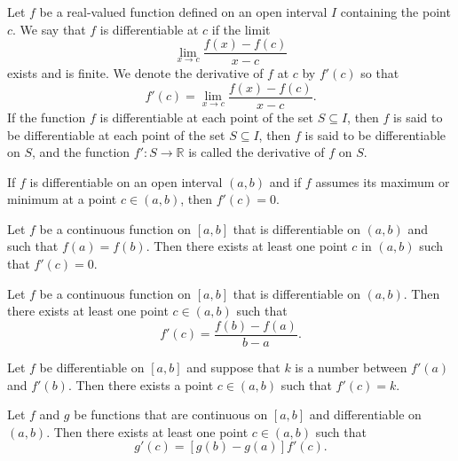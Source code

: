 \documentclass[nobib,notoc]{tufte-handout}
\begin{document}
\begin{defi}[differentiability]
	Let \(f\) be a real-valued function defined on an open interval \(I\) containing the point \(c\). We say that \(f\) is differentiable at \(c\) if the limit
	\begin{equation*}
		\lim_{x\rightarrow c}\frac{f(x)-f(c)}{x-c}
	\end{equation*}
	exists and is finite. We denote the derivative of \(f\) at \(c\) by \(f'(c)\) so that
	\begin{equation*}
		f'(c)=\lim_{x\rightarrow c}\frac{f(x)-f(c)}{x-c}.
	\end{equation*}
	If the function \(f\) is differentiable at each point of the set \(S\subseteq I\), then \(f\) is said to be differentiable at each point of the set \(S\subseteq I\), then \(f\) is said to be differentiable on \(S\), and the function \(f':S\rightarrow\mathbb{R}\) is called the derivative of \(f\) on \(S\).
\end{defi}
\begin{thm}
	If \(f\) is differentiable on an open interval \((a,b)\) and if \(f\) assumes its maximum or minimum at a point \(c\in(a,b)\), then \(f'(c)=0\).
\end{thm}
\begin{thm}
	Let \(f\) be a continuous function on \([a,b]\) that is differentiable on \((a,b)\) and such that \(f(a)=f(b)\). Then there exists at least one point \(c\) in \((a,b)\) such that \(f'(c)=0\).
\end{thm}
\begin{thm}[MVT]
	Let \(f\) be a continuous function on \([a,b]\) that is differentiable on \((a,b)\). Then there exists at least one point \(c\in(a,b)\) such that
	\begin{equation*}
		f'(c)=\frac{f(b)-f(a)}{b-a}.
	\end{equation*}
\end{thm}
\begin{thm}
	Let \(f\) be differentiable on \([a,b]\) and suppose that \(k\) is a number between \(f'(a)\) and \(f'(b)\). Then there exists a point \(c\in(a,b)\) such that \(f'(c)=k\).
\end{thm}
\begin{thm}
	Let \(f\) and \(g\) be functions that are continuous on \([a,b]\) and differentiable on \((a,b)\). Then there exists at least one point \(c\in(a,b)\) such that
	\begin{equation*}
		[f(b)-f(a)]g'(c)=[g(b)-g(a)]f'(c).
	\end{equation*}
\end{thm}
\end{document}
